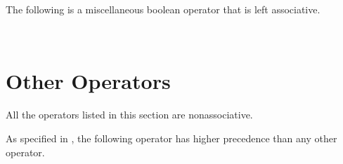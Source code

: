 The following is a miscellaneous boolean operator that is left associative.
\begin{tabbing}
\UnicodeKillLine
{} \\
\end{tabbing}

\section{Other Operators}
All the operators listed in this section are nonassociative.

As specified in ,
the following operator has higher precedence than any other operator.

\begin{tabbing}
\UnicodeKillLine
{} \\
\end{tabbing}


